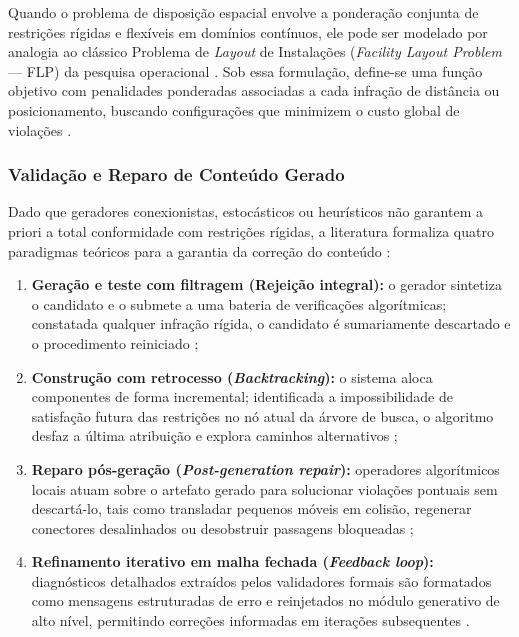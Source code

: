 Quando o problema de disposição espacial envolve a ponderação conjunta de restrições rígidas e flexíveis em domínios contínuos, ele pode ser modelado por analogia ao clássico Problema de \textit{Layout} de Instalações (\textit{Facility Layout Problem} --- FLP) da pesquisa operacional \cite{xu2025constraint, xu2025databasedrivenframework3dlevel}. Sob essa formulação, define-se uma função objetivo com penalidades ponderadas associadas a cada infração de distância ou posicionamento, buscando configurações que minimizem o custo global de violações \cite{xu2025constraint}.

\subsubsection{Validação e Reparo de Conteúdo Gerado}
\label{sec:validacao_reparo}

Dado que geradores conexionistas, estocásticos ou heurísticos não garantem a priori a total conformidade com restrições rígidas, a literatura formaliza quatro paradigmas teóricos para a garantia da correção do conteúdo \cite{pcgbook, summerville2018procedural, maleki2024procedural, xu2025databasedrivenframework3dlevel}:
\begin{enumerate}
    \item \textbf{Geração e teste com filtragem (Rejeição integral):} o gerador sintetiza o candidato e o submete a uma bateria de verificações algorítmicas; constatada qualquer infração rígida, o candidato é sumariamente descartado e o procedimento reiniciado \cite{pcgbook, maleki2024procedural};
    \item \textbf{Construção com retrocesso (\textit{Backtracking}):} o sistema aloca componentes de forma incremental; identificada a impossibilidade de satisfação futura das restrições no nó atual da árvore de busca, o algoritmo desfaz a última atribuição e explora caminhos alternativos \cite{tanagra, linden2014dungeons, russell2021artificial};
    \item \textbf{Reparo pós-geração (\textit{Post-generation repair}):} operadores algorítmicos locais atuam sobre o artefato gerado para solucionar violações pontuais sem descartá-lo, tais como transladar pequenos móveis em colisão, regenerar conectores desalinhados ou desobstruir passagens bloqueadas \cite{summerville2018procedural, sun2024roomplanner, xu2025databasedrivenframework3dlevel};
    \item \textbf{Refinamento iterativo em malha fechada (\textit{Feedback loop}):} diagnósticos detalhados extraídos pelos validadores formais são formatados como mensagens estruturadas de erro e reinjetados no módulo generativo de alto nível, permitindo correções informadas em iterações subsequentes \cite{hu2024scenecraft, nasir2024word2worldgeneratingstoriesworlds, her2025zeroshot3dmapgeneration}.
\end{enumerate}

